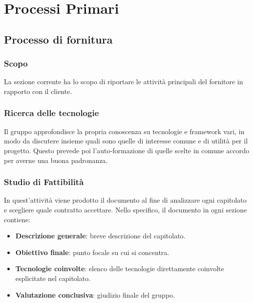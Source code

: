 \section{Processi Primari}\label{PP}

    \subsection{Processo di fornitura}\label{PP:Fornitura}	%

        \subsubsection{Scopo}\label{PP:Fornitura:Scopo}
		La sezione corrente ha lo scopo di riportare le  attività principali del fornitore in rapporto con il cliente. 
		
		\subsubsection{Ricerca delle tecnologie}
		Il gruppo approfondisce la propria conoscenza su tecnologie e framework vari, in modo da discutere insieme quali sono quelle di interesse comune e di utilità per il progetto. Questo prevede poi l'auto-formazione di quelle scelte in comune accordo per averne una buona padronanza.

        \subsubsection{Studio di Fattibilità}\label{PP:Fornitura:SdF} 
        In quest'attività viene prodotto il documento  al fine di analizzare ogni capitolato e scegliere quale contratto accettare. 
        Nello specifico, il documento in ogni sezione contiene:
        	\begin{itemize}
        		\item \textbf{Descrizione generale}: breve descrizione del capitolato.
        		\item \textbf{Obiettivo finale}: punto focale su cui si concentra.
        		\item \textbf{Tecnologie coinvolte}: elenco delle tecnologie direttamente coinvolte esplicitate nel capitolato.
        		\item \textbf{Valutazione conclusiva}: giudizio finale del gruppo.
        	\end{itemize}
        
